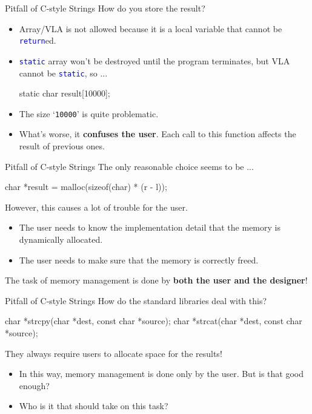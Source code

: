 \documentclass{beamer}
\newcommand{\blue}[1]{\textcolor{blue}{#1}}
\newcommand{\ttt}[1]{\texttt{#1}}
\newcommand{\bluett}[1]{\blue{\ttt{#1}}}
\theoremstyle{definition}
\begin{document}
\begin{frame}[fragile]{Pitfall of C-style Strings}
    How do you store the result?
    \begin{itemize}
        \pause
        \item Array/VLA is not allowed because it is a local variable that cannot be \bluett{return}ed.
        \pause
        \item \bluett{static} array won't be destroyed until the program terminates, but VLA cannot be \bluett{static}, so ...
        \begin{cpp}
static char result[10000];
        \end{cpp}
        \item The size `\ttt{10000}' is quite problematic.
        \pause
        \item What's worse, it \textbf{confuses the user}. Each call to this function affects the result of previous ones.
    \end{itemize}
\end{frame}

\begin{frame}[fragile]{Pitfall of C-style Strings}
    The only reasonable choice seems to be ...
    \begin{cpp}
char *result = malloc(sizeof(char) * (r - l));
    \end{cpp}
    \pause
    However, this causes a lot of trouble for the user.
    \begin{itemize}
        \item The user needs to know the implementation detail that the memory is dynamically allocated.
        \item The user needs to make sure that the memory is correctly freed.
    \end{itemize}
    \pause
    The task of memory management is done by \textbf{both the user and the designer}!
\end{frame}

\begin{frame}[fragile]{Pitfall of C-style Strings}
    How do the standard libraries deal with this?
    \pause
    \begin{cpp}
char *strcpy(char *dest, const char *source);
char *strcat(char *dest, const char *source);
    \end{cpp}
    They always require users to allocate space for the results!
    \pause
    \begin{itemize}
        \item In this way, memory management is done only by the user. But is that good enough?
        \item Who is it that should take on this task?
    \end{itemize}
\end{frame}
\end{document}

